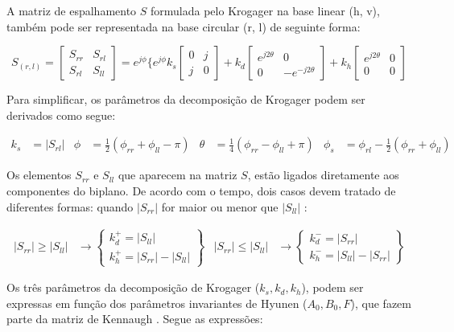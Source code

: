 \documentclass[a4paper,12pt]{article}
\begin{document}
A matriz de espalhamento $S$ formulada pelo Krogager na base linear (h, v), também pode ser representada na base circular (r, l) de seguinte forma:

\begin{equation}
        S_{(r, l)}= \begin{bmatrix}
    	S_{rr} & S_{rl}\\
    	S_{rl} & S_{ll}
	\end{bmatrix}
    =e^{j\phi}\{e^{j\phi}k_s\begin{bmatrix}
    	0 & j\\
    	j & 0
	\end{bmatrix}+k_d\begin{bmatrix}
    	e^{j2\theta} & 0\\
    	0 & -e^{-j2\theta}
	\end{bmatrix}+k_h\begin{bmatrix}
    	e^{j2\theta} & 0\\
    	0 & 0
	\end{bmatrix}
\end{equation}

Para simplificar, os parâmetros da decomposição de Krogager podem ser derivados como segue:

\begin{align}
    k_{s} &= |S_{rl}| &
    \phi &= \frac{1}{2} (\phi_{rr}+\phi_{ll}-\pi) &
    \theta &= \frac{1}{4} (\phi_{rr}-\phi_{ll}+\pi) &
    \phi_{s} &= \phi_{rl}-\frac{1}{2} (\phi_{rr}+\phi_{ll})
\end{align}

Os elementos $S_{rr}$ e $S_{ll}$ que aparecem na matriz $S$, estão ligados diretamente aos componentes do biplano. De acordo com o tempo, dois casos devem tratado de diferentes formas: quando  $|S_{rr}|$ for maior ou menor que $|S_{ll}|$ \cite{jong:2009}:

\begin{align}
    |S_{rr}|\geq|S_{ll}| &\rightarrow
	\begin{Bmatrix}
    	k^+_{d}=|S_{ll}| \\
    	k^+_{h}=|S_{rr}|-|S_{ll}|
	\end{Bmatrix} & 
	|S_{rr}|\leq|S_{ll}| &\rightarrow 
	\begin{Bmatrix}
    	k^-_{d}=|S_{rr}| \\
    	k^-_{h}=|S_{ll}|-|S_{rr}|
	\end{Bmatrix}
\end{align}

Os três parâmetros da decomposição de Krogager ($k_{s}, k_{d}, k_{h}$), podem ser expressas em função dos parâmetros invariantes de Hyunen ($A_{0}, B_{0}, F$), que fazem parte da matriz de Kennaugh \cite{jong:2009}. Segue as expressões:
\end{document}
